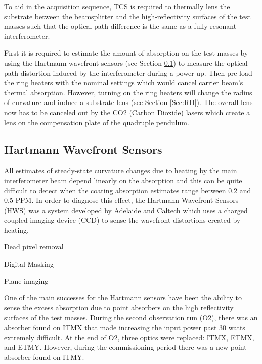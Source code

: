 	To aid in the acquisition sequence, TCS is required to thermally lens the substrate between the beamsplitter and the high-reflectivity surfaces of the test masses such that the optical path difference is the same as a fully resonant interferometer.
	
	First it is required to estimate the amount of absorption on the test masses by using the Hartmann wavefront sensors (see Section \ref{Sec:HWS}) to measure the optical path distortion induced by the interferometer during a power up.  Then pre-load the ring heaters with the nominal settings which would cancel carrier beam's thermal absorption.  However, turning on the ring heaters will change the radius of curvature and induce a substrate lens (see Section \ref{Sec:RH}).  The overall lens now has to be canceled out by the CO2 (Carbon Dioxide) lasers which create a lens on the compensation plate of the quadruple pendulum.

	\subsection{Hartmann Wavefront Sensors}\label{Sec:HWS}
	All estimates of steady-state curvature changes due to heating by the main interferometer beam depend linearly on the absorption and this can be quite difficult to detect when the coating absorption estimates range between 0.2 and 0.5 PPM.  In order to diagnose this effect, the Hartmann Wavefront Sensors (HWS) was a system developed by Adelaide and Caltech which uses a charged coupled imaging device (CCD) to sense the wavefront distortions created by heating.
	
	Dead pixel removal
	
	Digital Masking
	
	Plane imaging
	
	One of the main successes for the Hartmann sensors have been the ability to sense the excess absorption due to point absorbers on the high reflectivity surfaces of the test masses.  During the second observation run (O2), there was an absorber found on ITMX that made increasing the input power past 30 watts extremely difficult.  At the end of O2, three optics were replaced: ITMX, ETMX, and ETMY.  However, during the commissioning period there was a new point absorber found on ITMY.
	
	\cite{AWC_current}
	
	\cite{Brooks_OffAxis}
	
	\cite{Veitch_HWS_ALIGO}
	
	\cite{Brooks_HWS_2009}
	
